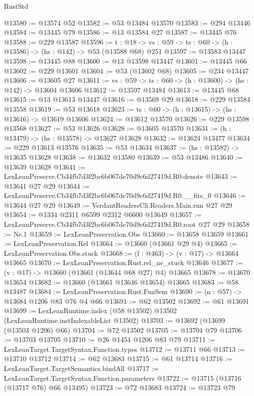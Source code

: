 \begin{lexlean}{RustStd}
\begin{coremodule}
@13580 := @13574 @52
@13582 := @53 @13484 @13570
@13583 := @294 @13446
@13584 := @13445 @79
@13586 := @13 @13584 @27
@13587 := @13445 @76
@13588 := @229 @13587
@13596 := {t : @18} ->
  {vs : @59} -> {ts : @60} -> (h : @13586) -> (hs : @142) -> @53 (@13588 @68) @251
@13597 := @13583 @13447
@13598 := @13445 @88
@13600 := @13 @13598 @13447
@13601 := @13445 @66
@13602 := @229 @13601
@13604 := @53 (@13602 @68)
@13605 := @234 @13447
@13606 := @13605 @27
@13611 := {vs : @59} -> {ts : @60} -> (h : @13600) -> (hs : @142) -> @13604 @13606
@13612 := @13597 @13484
@13613 := @13445 @68
@13615 := @13 @13613 @13447
@13616 := @13569 @29
@13618 := @229 @13584 @13558
@13619 := @53 @13618
@13623 := {ts : @60} -> (h : @13615) -> (hs : @13616) -> @13619 @13606
@13624 := @13612 @13570
@13626 := @229 @13598 @13568
@13627 := @53 @13626
@13628 := @13605 @13570
@13631 := (h : @13479) -> (hs : @13578) -> @13627 @13628
@13632 := @13624 @13477
@13634 := @229 @13613 @13576
@13635 := @53 @13634
@13637 := (hs : @13582) -> @13635 @13628
@13638 := @13632 @13580
@13639 := @53 @13486
@13640 := @13639 @13628
@13641 := LexLeanPreserve.Cb34fb7d3f2bc6b067de70d9c6d27419d.R0.denote
@13643 := @13641 @27 @29
@13644 := LexLeanPreserve.Cb34fb7d3f2bc6b067de70d9c6d27419d.R0.__fits_0
@13646 := @13644 @27 @29
@13649 := VerdantReadersCli.Readers.Main.run @27 @29
@13654 := @1334 @2311 @6599 @2312 @6600 @13649
@13657 := LexLeanPreserve.Cb34fb7d3f2bc6b067de70d9c6d27419d.R0.root @27 @29
@13658 := Ne.{1}
@13659 := LexLeanPreservation.Obs
@13660 := @13658 @13659
@13661 := LexLeanPreservation.Rel
@13664 := @13660 (@13661 @29 @4)
@13665 := LexLeanPreservation.Obs.stuck
@13668 := (f : @463) -> (v : @17) -> @13664 @13665
@13670 := LexLeanPreservation.Rust.rel_ne_stuck @13646
@13677 := (v : @17) -> @13660 (@13661 (@13644 @68 @27) @4) @13665
@13678 := @13670 @13654
@13682 := @13660 (@13661 @13646 @13654) @13665
@13683 := @58 @13487
@13684 := LexLeanPreservation.Rust.FunSem
@13690 := (n : @57) -> @13684 @1206 @83 @76 @4 @66
@13691 := @62 @13502
@13692 := @61 @13691
@13699 := LexLeanRuntime.index (@58 @13502) @13502 (LexLeanRuntime.instIndexableList @13502)
@13703 := @13692 (@13699 (@13503 @1206) @66)
@13704 := @72 @13502
@13705 := @13704 @79
@13706 := @13703 @13705
@13710 := @26 @1454 @1206 @83 @79
@13711 := LexLeanTarget.TargetSyntax.Function.types
@13712 := @13711 @66
@13713 := @13710 @13712
@13714 := @62 @13683
@13715 := @61 @13714
@13716 := LexLeanTarget.TargetSemantics.bindAll
@13717 := LexLeanTarget.TargetSyntax.Function.parameters
@13722 := @13715 (@13716 (@13717 @76) @66 @13495)
@13723 := @72 @13683
@13724 := @13723 @79

\end{coremodule}
\end{lexlean}
